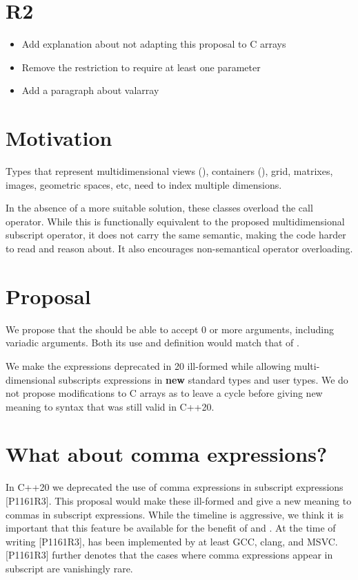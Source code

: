 \documentclass{wg21}
\begin{document}
\section{R2}

\begin{itemize}
    \item Add explanation about not adapting this proposal to C arrays
    \item Remove the restriction to require at least one parameter
    \item Add a paragraph about valarray
\end{itemize}

\section{Motivation}

Types that represent multidimensional views (), containers (), grid, matrixes, images,
geometric spaces, etc, need to index multiple dimensions.

In the absence of a more suitable solution, these classes overload the call operator.
While this is functionally equivalent to the proposed multidimensional subscript operator, it does not carry the same semantic, making the code harder to read and reason about. It also encourages non-semantical operator overloading.

\section{Proposal}
We propose that the  should be able to accept 0 or more arguments, including variadic arguments.
Both its use and definition would match that of .

We make the expressions deprecated in 20 ill-formed while allowing multi-dimensional subscripts expressions in \textbf{new} standard types
and user types. We do not propose modifications to C arrays as to leave a cycle before giving new meaning to syntax that was still valid in C++20.

\section{What about comma expressions?}

In C++20 we deprecated the use of comma expressions in subscript expressions [P1161R3]\cite{P1161R3}.
This proposal would make these ill-formed and give a new meaning to commas in subscript expressions.
While the timeline is aggressive, we think it is important that this feature be available for the benefit of  and .
At the time of writing [P1161R3], \cite{P1161R3} has been implemented by at least GCC, clang, and MSVC.
[P1161R3]\cite{P1161R3} further denotes that the cases where comma expressions appear in subscript are vanishingly rare.
\end{document}
